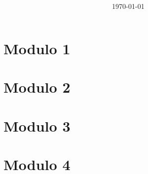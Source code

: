 \documentclass[12pt,a4paper]{article}
\author{ }
\date{\today}
\title{ }
\begin{document}
\section{Modulo 1}

\section{Modulo 2}

\section{Modulo 3}

\section{Modulo 4}
\end{document}
